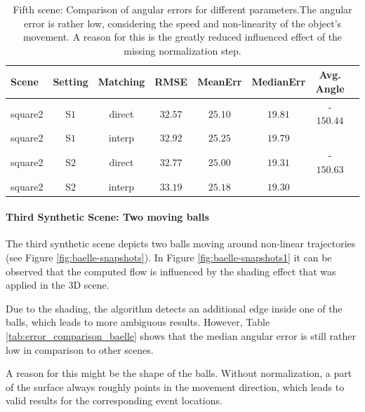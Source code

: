 \begin{table}[tb]
	\centering
		\begin{tabular}{lccccccc}
Scene & Setting & Matching & RMSE & MeanErr & MedianErr & Avg. Angle \\
\hline  \hline
square2 & S$1$ & direct & $32.57$ & $25.10$ & $19.81$ & -$150.44$ & \\
square2 & S$1$ & interp & $32.92$ & $25.25$ & $19.79$ &  & \\
square2 & S$2$ & direct & $32.77$ & $25.00$ & $19.31$ & -$150.63$ & \\
square2 & S$2$ & interp & $33.19$ & $25.18$ & $19.30$ &  & \\
		\end{tabular}
	\caption[Fifth scene: Comparison of angular errors for different parameters.]{Fifth scene: Comparison of angular errors for different parameters.The angular error is rather low, considering the speed and non-linearity of the object's movement.
	A reason for this is the greatly reduced influenced effect of the missing normalization step.}
	\label{tab:error_comparison_square2}
\end{table}

\paragraph{Third Synthetic Scene: Two moving balls}

The third synthetic scene depicts two balls moving around non-linear trajectories (see Figure \ref{fig:baelle-snapshots}). 
In Figure \ref{fig:baelle-snapshots1} it can be observed that the computed flow is influenced by the shading effect that was applied in the 3D scene. 

Due to the shading, the algorithm detects an additional edge inside one of the balls, which leads to more ambiguous results.
However, Table \ref{tab:error_comparison_baelle} shows that the median angular error is still rather low in comparison to other scenes.

A reason for this might be the shape of the balls. 
Without normalization, a part of the surface always roughly points in the movement direction, which leads to valid results for the corresponding event locations.

